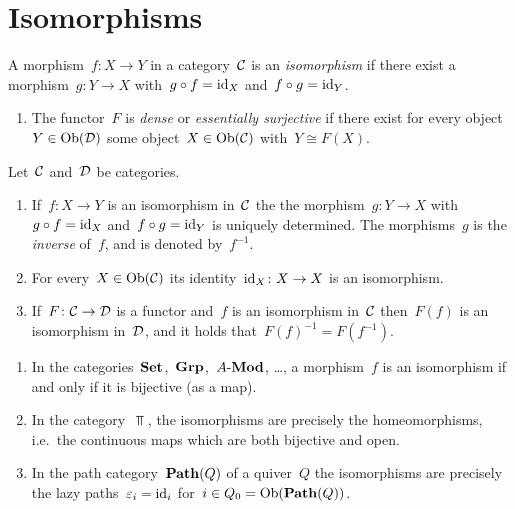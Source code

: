 \section{Isomorphisms}


\begin{definition}
  A morphism~$f \colon X \to Y$ in a category~$\mathcal{C}$ is an \emph{isomorphism} if there exist a morphism~$g \colon Y \to X$ with~$g \circ f = \mathrm{id}_X$ and~$f \circ g = \mathrm{id}_Y$.
\end{definition}


\begin{definition}[continues=properties of functors]
  \leavevmode
  \begin{enumerate}[start=4]
    \item
      The functor~$F$ is \emph{dense} or \emph{essentially surjective} if there exist for every object~$Y \in \operatorname{Ob}(\mathcal{D})$ some object~$X \in \operatorname{Ob}(\mathcal{C})$ with~$Y \cong F(X)$.
  \end{enumerate}
\end{definition}


\begin{remark}
  Let~$\mathcal{C}$ and~$\mathcal{D}$ be categories.
  \begin{enumerate}
    \item
      If~$f \colon X \to Y$ is an isomorphism in~$\mathcal{C}$ the the morphism~$g \colon Y \to X$ with~$g \circ f = \mathrm{id}_X$ and~$f \circ g = \mathrm{id}_Y$ is uniquely determined.
      The morphisms~$g$ is the \emph{inverse} of~$f$, and is denoted by~$f^{-1}$.
    \item
      For every~$X \in \operatorname{Ob}(\mathcal{C})$ its identity~$\mathrm{id}_X \colon X \to X$ is an isomorphism.
    \item
      If~$F \colon \mathcal{C} \to \mathcal{D}$ is a functor and~$f$ is an isomorphism in~$\mathcal{C}$ then~$F(f)$ is an isomorphism in~$\mathcal{D}$, and it holds that~$F(f)^{-1} = F(f^{-1})$.
  \end{enumerate}
\end{remark}


\begin{example}
  \leavevmode
  \begin{enumerate}
    \item
      In the categories~$\mathbf{Set}$,~$\mathbf{Grp}$,~$\text{$A$-$\mathbf{Mod}$}$, \dots, a morphism~$f$ is an isomorphism if and only if it is bijective (as a  map).
    \item
      In the category~$\Top$, the isomorphisms are precisely the homeomorphisms, i.e.\ the continuous maps which are both bijective and open.
    \item
      In the path category~$\mathbf{Path}(Q)$ of a quiver~$Q$ the isomorphisms are precisely the lazy paths~$\varepsilon_i = \mathrm{id}_i$ for~$i \in Q_0 = \operatorname{Ob}(\mathbf{Path}(Q))$.
  \end{enumerate}
\end{example}






